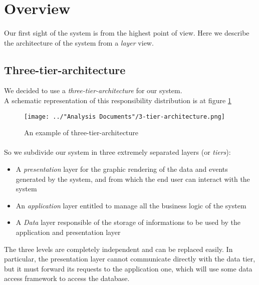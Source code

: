 \section{Overview}
\paragraph{}Our first sight of the system is from the highest point of view. Here we describe the architecture of the system from a \textit{layer} view.

\subsection{Three-tier-architecture}
We decided to use a \textit{three-tier-architecture} for our system.\\
A schematic representation of this responsibility distribution is at figure \ref{fig:3-tier-architecture}

\begin{figure}[H]
	\centering
	\texttt{[image: ../"Analysis Documents"/3-tier-architecture.png]}
	\caption{An example of three-tier-architecture}
	\label{fig:3-tier-architecture}
\end{figure}
\paragraph{} So we subdivide our system in three extremely separated layers (or \textit{tiers}):
\begin{itemize}
	\item A \textit{presentation} layer for the graphic rendering of the data and events generated by the system, and from which the end user can interact with the system
	\item An \textit{application} layer entitled to manage all the business logic of the system
	\item A \textit{Data} layer responsible of the storage of informations to be used by the application and presentation layer
\end{itemize}
The three levels are completely independent and can be replaced easily. In particular, the presentation layer cannot communicate directly with the data tier, but it must forward its requests to the application one, which will use some data access framework to access the database.
